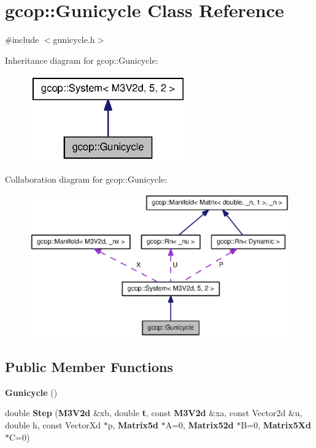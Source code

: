 \section{gcop\-:\-:\-Gunicycle \-Class \-Reference}
\label{classgcop_1_1Gunicycle}


{\ttfamily \#include $<$gunicycle.\-h$>$}



\-Inheritance diagram for gcop\-:\-:\-Gunicycle\-:\nopagebreak
\begin{figure}[H]
\begin{center}
\leavevmode
\includegraphics[width=192pt]{classgcop_1_1Gunicycle__inherit__graph}
\end{center}
\end{figure}


\-Collaboration diagram for gcop\-:\-:\-Gunicycle\-:\nopagebreak
\begin{figure}[H]
\begin{center}
\leavevmode
\includegraphics[width=350pt]{classgcop_1_1Gunicycle__coll__graph}
\end{center}
\end{figure}
\subsection*{\-Public \-Member \-Functions}
\begin{DoxyCompactItemize}
\item 
{\bf \-Gunicycle} ()
\item 
double {\bf \-Step} ({\bf \-M3\-V2d} \&xb, double {\bf t}, const {\bf \-M3\-V2d} \&xa, const \-Vector2d \&u, double h, const \-Vector\-Xd $\ast$p, {\bf \-Matrix5d} $\ast$\-A=0, {\bf \-Matrix52d} $\ast$\-B=0, {\bf \-Matrix5\-Xd} $\ast$\-C=0)
\end{DoxyCompactItemize}
